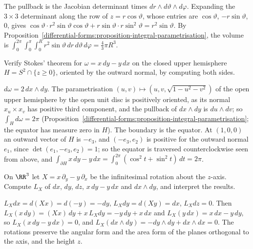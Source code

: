 \begin{solution}
The pullback is the Jacobian determinant times $dr \wedge d\vartheta \wedge d\varphi$. Expanding the $3 \times 3$ determinant along the row of $z = r\cos\vartheta$, whose entries are
$\cos\vartheta$, $-r\sin\vartheta$, $0$, gives $\cos\vartheta \cdot r^2\sin\vartheta\cos\vartheta + r\sin\vartheta \cdot r\sin^2\vartheta = r^2\sin\vartheta$. By
Proposition~\ref{differential-forms:proposition-integral-parametrisation}, the volume is $\int_0^{2\pi}\int_0^\pi\int_0^Rr^2\sin\vartheta\,dr\,d\vartheta\,d\varphi = \frac43\pi R^3$.
\end{solution}

\begin{exercise}\label{differential-forms:exercise-stokes-hemisphere}
Verify Stokes' theorem for $\omega = x\,dy - y\,dx$ on the closed upper hemisphere $H = S^2 \cap \{z \geq 0\}$, oriented by the outward normal, by computing both sides.
\end{exercise}

\begin{solution}
$d\omega = 2\,dx \wedge dy$. The parametrisation $(u, v) \mapsto (u, v, \sqrt{1 - u^2 - v^2})$ of the open upper hemisphere by the open unit disc is positively oriented, as its normal
$x_u \times x_v$ has positive third component, and the pullback of $dx \wedge dy$ is $du \wedge dv$; so $\int_Hd\omega = 2\pi$
(Proposition~\ref{differential-forms:proposition-integral-parametrisation}; the equator has measure zero in $H$). The boundary is the equator. At $(1, 0, 0)$ an outward vector of $H$ is $-e_3$,
and $(-e_3, e_2)$ is positive for the outward normal $e_1$, since $\det(e_1, -e_3, e_2) = 1$; so the equator is traversed counterclockwise seen from above, and
$\int_{\partial H}x\,dy - y\,dx = \int_0^{2\pi}(\cos^2t + \sin^2t)\,dt = 2\pi$.
\end{solution}

\begin{exercise}\label{differential-forms:exercise-lie-derivative-rotation}
On $\RR^3$ let $X = x\,\partial_y - y\,\partial_x$ be the infinitesimal rotation about the $z$-axis. Compute $L_X$ of $dx$, $dy$, $dz$, $x\,dy - y\,dx$ and $dx \wedge dy$, and interpret the results.
\end{exercise}

\begin{solution}
$L_Xdx = d(Xx) = d(-y) = -dy$, $L_Xdy = d(Xy) = dx$, $L_Xdz = 0$. Then $L_X(x\,dy) = (Xx)\,dy + x\,L_Xdy = -y\,dy + x\,dx$ and $L_X(y\,dx) = x\,dx - y\,dy$, so
$L_X(x\,dy - y\,dx) = 0$, and $L_X(dx \wedge dy) = -dy \wedge dy + dx \wedge dx = 0$. The rotations preserve the angular form and the area form of the planes orthogonal to the axis, and the
height $z$.
\end{solution}

